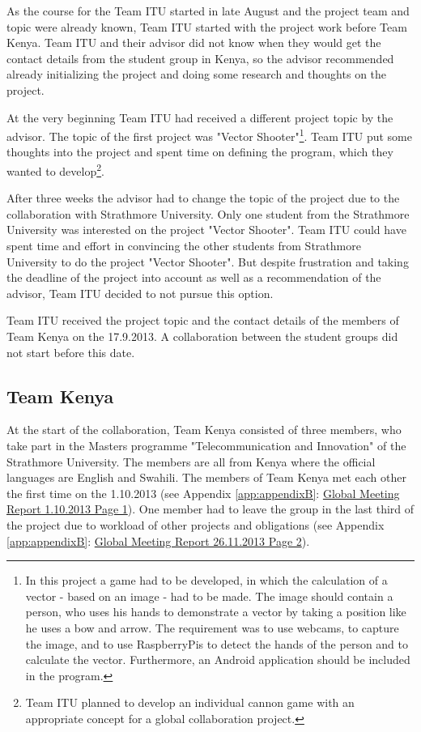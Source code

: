 As the course for the Team ITU started in late August and the project team and topic were already known, Team ITU started with the project work before Team Kenya. Team ITU and their advisor did not know when they would get the contact details from the student group in Kenya, so the advisor recommended already initializing the project and doing some research and thoughts on the project.

At the very beginning Team ITU had received a different project topic by the advisor. The topic of the first project was "Vector Shooter"\footnote{In this project a game had to be developed, in which the calculation of a vector - based on an image - had to be made. The image should contain a person, who uses his hands to demonstrate a vector by taking a position like he uses a bow and arrow. The requirement was to use webcams, to capture the image, and to use RaspberryPis to detect the hands of the person and to calculate the vector. Furthermore, an Android application should be included in the program.}. Team ITU put some thoughts into the project and spent time on defining the program, which they wanted to develop\footnote{Team ITU planned to develop an individual cannon game with an appropriate concept for a global collaboration project.}.

After three weeks the advisor had to change the topic of the project due to the collaboration with Strathmore University. Only one student from the Strathmore University was interested on the project "Vector Shooter". Team ITU could have spent time and effort in convincing the other students from Strathmore University to do the project "Vector Shooter". But despite frustration and taking the deadline of the project into account as well as a recommendation of the advisor, Team ITU decided to not pursue this option.

Team ITU received the project topic and the contact details of the members of Team Kenya on the 17.9.2013. A collaboration between the student groups did not start before this date.


\subsection{Team Kenya}
\label{sec:team_Kenya}

At the start of the collaboration, Team Kenya consisted of three members, who take part in the Masters programme "Telecommunication and Innovation" of the Strathmore University. The members are all from Kenya where the official languages are English and Swahili. The members of Team Kenya met each other the first time on the 1.10.2013 (see Appendix \ref{app:appendixB}: \hyperlink{GSD20131001.1}{Global Meeting Report 1.10.2013 Page 1}). One member had to leave the group in the last third of the project due to workload of other projects and obligations (see Appendix \ref{app:appendixB}: \hyperlink{GSD20131126.2}{Global Meeting Report 26.11.2013 Page 2}).

